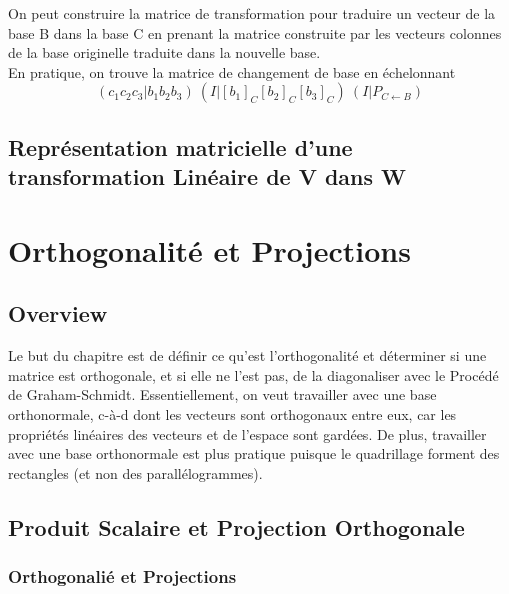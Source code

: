 \documentclass{article}
\begin{document}
\begin{remark}
    On peut construire la matrice de transformation pour traduire un
    vecteur de la base B dans la base C en prenant la matrice construite
    par les vecteurs colonnes de la base originelle traduite dans la
    nouvelle base.\\
    En pratique, on trouve la matrice de changement de base en échelonnant
    $$ (c_1 c_2 c_3 | b_1 b_2 b_3) ~ (I | [b_1]_C [b_2]_C [b_3]_C)
    ~ (I | P_{C \leftarrow B})$$
\end{remark}

\begin{remark}

\end{remark}

\subsection{Représentation matricielle d'une transformation Linéaire de V
dans W}

\pagebreak

\section{Orthogonalité et Projections}

\subsection{Overview}

Le but du chapitre est de définir ce qu'est l'orthogonalité et déterminer
si une matrice est orthogonale, et si elle ne l'est pas, de la diagonaliser
avec le Procédé de Graham-Schmidt. Essentiellement, on veut travailler
avec une base orthonormale, c-à-d dont les vecteurs sont orthogonaux
entre eux, car les propriétés linéaires des vecteurs et de l'espace sont
gardées. De plus, travailler avec une base orthonormale est plus pratique
puisque le quadrillage forment des rectangles (et non des parallélogrammes).

\subsection{Produit Scalaire et Projection Orthogonale}

\subsubsection{Orthogonalié et Projections}
\end{document}
